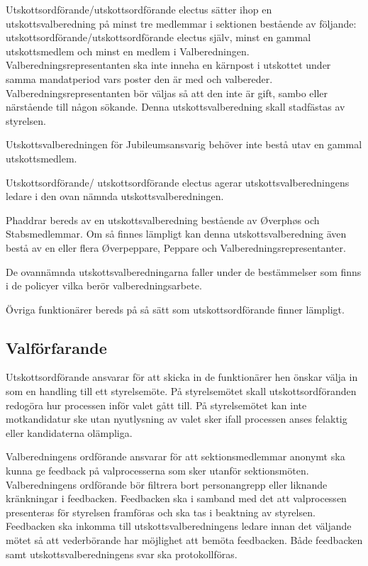 \documentclass{dsekprotokoll}
\begin{document}
Utskottsordförande/utskottsordförande electus sätter ihop en utskottsvalberedning på minst tre medlemmar i sektionen bestående av följande: utskottsordförande/utskottsordförande electus själv, minst en gammal utskottsmedlem och minst en medlem i Valberedningen. Valberedningsrepresentanten ska inte inneha en kärnpost i utskottet under samma mandatperiod vars poster den är med och valbereder. Valberedningsrepresentanten bör väljas så att den inte är gift, sambo eller närstående till någon sökande. Denna utskottsvalberedning skall stadfästas av styrelsen.

Utskottsvalberedningen för Jubileumsansvarig behöver inte bestå utav en gammal utskottsmedlem.

Utskottsordförande/ utskottsordförande electus agerar utskottsvalberedningens ledare i den ovan nämnda utskottsvalberedningen.


Phaddrar bereds av en utskottsvalberedning bestående av Øverphøs och Stabsmedlemmar. Om så
finnes lämpligt kan denna utskottsvalberedning även bestå av en eller flera Øverpeppare, Peppare
och Valberedningsrepresentanter.

De ovannämnda utskottsvalberedningarna faller under de bestämmelser som finns i de policyer
vilka berör valberedningsarbete.

Övriga funktionärer bereds på så sätt som utskottsordförande finner lämpligt.

\subsection{Valförfarande}
Utskottsordförande ansvarar för att skicka in de funktionärer hen önskar välja in som en handling till ett styrelsemöte. På styrelsemötet skall utskottsordföranden redogöra hur processen inför valet gått till. På styrelsemötet kan inte motkandidatur ske utan nyutlysning av valet sker ifall processen anses felaktig eller kandidaterna olämpliga.

Valberedningens ordförande ansvarar för att sektionsmedlemmar anonymt ska kunna ge
feedback på valprocesserna som sker utanför sektionsmöten. Valberedningens ordförande bör filtrera bort personangrepp eller liknande kränkningar i feedbacken. Feedbacken ska i samband
med det att valprocessen presenteras för styrelsen framföras och ska tas i beaktning av
styrelsen. Feedbacken ska inkomma till utskottsvalberedningens ledare innan det väljande mötet
så att vederbörande har möjlighet att bemöta feedbacken. Både feedbacken samt utskottsvalberedningens svar ska protokollföras.
\end{document}
